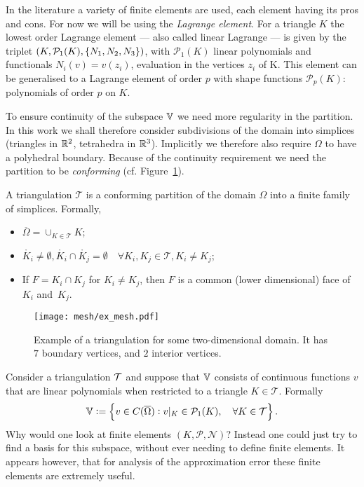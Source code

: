 \documentclass[thesis.tex]{subfiles}
\begin{document}
  In the literature a variety of finite elements are used, each element having its pros and cons. For now we will be using  the \emph{Lagrange element}.
  For a triangle $K$ the lowest order Lagrange element  --- also called linear Lagrange --- is given by the 
  triplet $(K, \mathcal{P}_1(K), \set{N_1, N_2, N_3})$, with $\mathcal{P}_1(K)$ linear polynomials and functionals $N_i(v) = v(z_i)$,
  evaluation in the vertices $z_i$ of K. This element can be generalised to a Lagrange element of order $p$ with shape functions $\mathcal{P}_p(K)$: polynomials of order $p$ on $K$.

  To ensure continuity of the subspace $\mathbb{V}$ we need more regularity in the partition. In this work  we shall therefore consider subdivisions of the domain into simplices (triangles in $\mathbb{R}^2$, tetrahedra in $\mathbb{R}^3$). Implicitly we therefore also require $\Omega$ to have a polyhedral boundary. Because of the continuity requirement we need the partition to be \emph{conforming} (cf. Figure~\ref{fig:triangulation}).
  \begin{defn}
    A triangulation $\mathcal{T}$ is a conforming partition of the domain $\Omega$ into a finite family of simplices.
    Formally,
    \begin{itemize}
      \item $\overline{\Omega} = \cup_{K \in \mathcal{T}} K$;
      \item $\mathring{K_i} \ne \emptyset, \mathring{K_i} \cap \mathring{K_j} = \emptyset \quad \forall K_i, K_j \in \mathcal{T}, K_i \ne K_j$;
    \item If $F = K_i \cap K_j$ for $K_i \ne K_j$, then $F$ is a common (lower dimensional) face of $K_i$ and~$K_j$.
  \end{itemize}
  \end{defn}
  \begin{figure}
    \centering
    \texttt{[image: mesh/ex\_mesh.pdf]}
    \caption{Example of a triangulation for some two-dimensional domain. It has $7$ boundary vertices, and $2$ interior vertices.}
    \label{fig:triangulation}
  \end{figure}

  Consider a triangulation $\mathcal{T}$ and suppose that $\mathbb{V}$ consists
  of continuous functions $v$ that are linear polynomials when restricted to a triangle $K \in \mathcal{T}$. Formally
  \begin{equation}
    \label{eq:linlagr}
    \mathbb{V} := \set{v \in C(\overline{\Omega}) : v|_{K} \in \mathcal{P}_1(K), \quad \forall K \in \mathcal{T}}.
  \end{equation}
  Why
  would one look at finite elements $(K, \mathcal{P}, \mathcal{N})$? 
  Instead one could just try to find a basis for this subspace, without ever needing to define finite elements.
  It appears however, that for analysis of the approximation error these finite elements are extremely useful.
\end{document}
